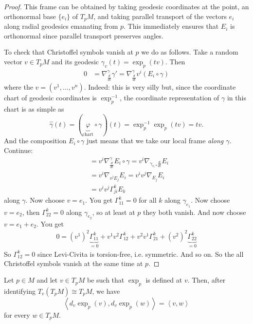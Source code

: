 \begin{proof}
This frame can be obtained by taking geodesic
coordinates at the point, an
orthonormal base $\{e_i\}$ of $T_pM$, and
taking parallel transport of the
vectors $e_i$ along radial geodesics
emanating from $p$. This immediately
ensures that $E_i$ is orthonormal since
parallel transport preserves angles.

To check that Christoffel symbols vanish at
$p$ we do as follows.
Take a random vector $v \in T_pM$ and its
geodesic
$\gamma_v(t)=\operatorname{exp}_p(tv)$. Then
$$
\begin{aligned}
0&=\nabla_{\frac{d}{dt}}^{\gamma}\gamma'
=\nabla^{\gamma}_{\frac{d}{dt}}v^i(E_i\circ
\gamma)
\end{aligned}
$$
where the $v=(v^1,\ldots,v^n)$. Indeed: this
is very silly but, since the
coordinate chart of geodesic coordinates is
$\operatorname{exp}_p^{-1}$,
the coordinate representation of $\gamma$ in
this chart is as simple as
$$
\hat{\gamma}(t)=(\underbrace{\varphi}
_{\text{chart}}
\circ \gamma)(t)
=\operatorname{exp}_p^{-1}
\operatorname{exp}_p(tv)=tv.
$$
And the composition $E_i \circ \gamma$ just
means that we take our local
frame \textit{along $\gamma$}. Continue:
$$
\begin{aligned}
&=v^i\nabla^{\gamma}_{\frac{d}{dt}}
E_i\circ\gamma
=v^i\nabla_{\gamma_{v,*} \frac{d}{dt}}E_i\\
&=v^i\nabla_{v^jE_j}E_i=v^iv^j\nabla_{E_j}
E_i\\&
=v^iv^j\Gamma_{ji}^kE_k
\end{aligned}
$$
along $\gamma$. Now choose $v=e_1$. You get
$\Gamma_{11}^k=0$ for all $k$ along
$\gamma_{e_1}$. Now choose $v=e_2$, then
$\Gamma_{22}^k=0$ along $\gamma_{e_2}$, so at
least at $p$ they both vanish. And now choose
$v=e_1+e_2$. You get
$$
\begin{aligned}
0=(v^1)^2 \underbrace{\Gamma_{1 1}^k}_{=0}
+v^1v^2 \Gamma_{1 2}^k+v^2v^1\Gamma_{2 1}^k
+(v^2)^2\underbrace{\Gamma_{2 2}^k}_{=0}
\end{aligned}
$$
So $\Gamma_{12}^k=0$ since Levi-Civita is
torsion-free, i.e. symmetric.
And so on. So the all Christoffel symbols
vanish at the same time at $p$.
\end{proof}

\begin{lemma}
\label{lemma-Gauss}
Let $p\in M$ and let $v\in T_pM$ be such
that $\exp_p$ is defined at $v$. Then, after
identifying $T_v(T_pM)\cong T_pM$, we have
$$
\left\langle{}d_v\exp_p(v),d_v\exp_p(w)
\right\rangle{}
=
\left\langle{}v,w\right\rangle{}
$$
for every $w\in T_pM$.
\end{lemma}

